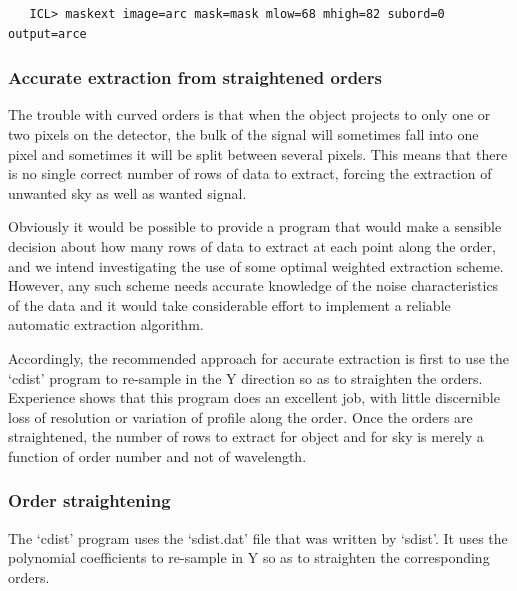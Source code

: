 \documentclass[11pt,twoside]{article}
\begin{document}
\begin{verbatim}
   ICL> maskext image=arc mask=mask mlow=68 mhigh=82 subord=0 output=arce
\end{verbatim}


\subsubsection{\label{techno13accurate}
   Accurate extraction from straightened orders}

   The trouble with curved orders is that when the object projects to
   only one or two pixels on the detector, the bulk of the signal will
   sometimes fall into one pixel and sometimes it will be split between
   several pixels. This means that there is no single correct number of
   rows of data to extract, forcing the extraction of unwanted sky as
   well as wanted signal.

   Obviously it would be possible to provide a program that would make
   a sensible decision about how many rows of data to extract at each
   point along the order, and we intend investigating the use of some
   optimal weighted extraction scheme. However, any such scheme needs
   accurate knowledge of the noise characteristics of the data and it
   would take considerable effort to implement a reliable automatic
   extraction algorithm.

   Accordingly, the recommended approach for accurate extraction is
   first to use the `cdist' program to re-sample in the Y direction so
   as to straighten the orders. Experience shows that this program
   does an excellent job, with little discernible loss of resolution or
   variation of profile along the order. Once the orders are
   straightened, the number of rows to extract for object and for sky is
   merely a function of order number and not of wavelength.


\subsubsection{Order straightening}

   The `cdist' program uses the `sdist.dat' file that was written by
   `sdist'. It uses the polynomial coefficients to re-sample in Y so as
   to straighten the corresponding orders.
\end{document}
